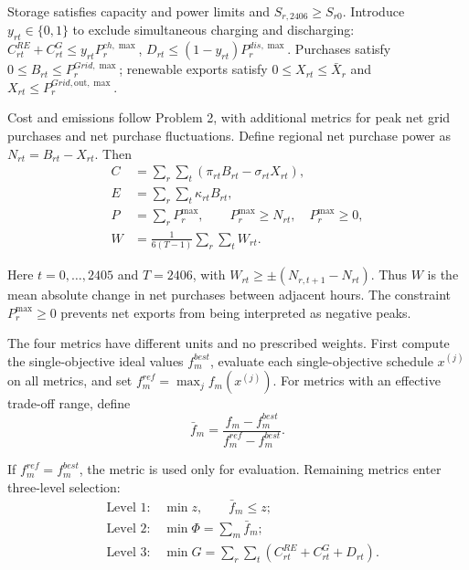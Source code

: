 Storage satisfies capacity and power limits and $S_{r,2406}\geq S_{r0}$. Introduce $y_{rt}\in\{0,1\}$ to exclude simultaneous charging and discharging:
$C^{RE}_{rt}+C^G_{rt}\leq y_{rt}P_r^{ch,\max}$,
$D_{rt}\leq(1-y_{rt})P_r^{dis,\max}$.
Purchases satisfy $0\leq B_{rt}\leq P_r^{Grid,\max}$; renewable exports satisfy $0\leq X_{rt}\leq\bar X_r$ and $X_{rt}\leq P_r^{Grid,\mathrm{out},\max}$.

Cost and emissions follow Problem 2, with additional metrics for peak net grid purchases and net purchase fluctuations.
Define regional net purchase power as $N_{rt}=B_{rt}-X_{rt}$.
Then
\begin{equation}
	\begin{aligned}
		C&=
		\sum_r\sum_t
		\left(
		\pi_{rt}B_{rt}-\sigma_{rt}X_{rt}
		\right),\\
		E&=
		\sum_r\sum_t
		\kappa_{rt}B_{rt},\\
		P&=
		\sum_rP_r^{\max},
		\qquad
		P_r^{\max}\geq N_{rt},\quad
		P_r^{\max}\geq0,\\
		W&=
		\frac{1}{6(T-1)}
		\sum_r\sum_tW_{rt}.
	\end{aligned}
	\label{eq:q3_objectives}
\end{equation}

Here $t=0,\ldots,2405$ and $T=2406$, with $W_{rt}\geq\pm(N_{r,t+1}-N_{rt})$. Thus $W$ is the mean absolute change in net purchases between adjacent hours. The constraint $P_r^{\max}\geq0$ prevents net exports from being interpreted as negative peaks.

The four metrics have different units and no prescribed weights. First compute the single-objective ideal values $f_m^{best}$, evaluate each single-objective schedule $x^{(j)}$ on all metrics, and set $f_m^{ref}=\max_j f_m(x^{(j)})$.
For metrics with an effective trade-off range, define
\begin{equation}
	\bar f_m
	=
	\frac{f_m-f_m^{best}}
	{f_m^{ref}-f_m^{best}}.
	\label{eq:q3_normalization}
\end{equation}

If $f_m^{ref}=f_m^{best}$, the metric is used only for evaluation. Remaining metrics enter three-level selection:
\begin{equation}
	\begin{aligned}
        &\text{Level 1:}\quad
		\min z,
		\qquad
		\bar f_m\leq z;\\
        &\text{Level 2:}\quad
		\min \Phi=\sum_m\bar f_m;\\
        &\text{Level 3:}\quad
		\min G=
		\sum_r\sum_t
		\left(
		C^{RE}_{rt}+C^G_{rt}+D_{rt}
		\right).
	\end{aligned}
	\label{eq:q3_multilevel}
\end{equation}

